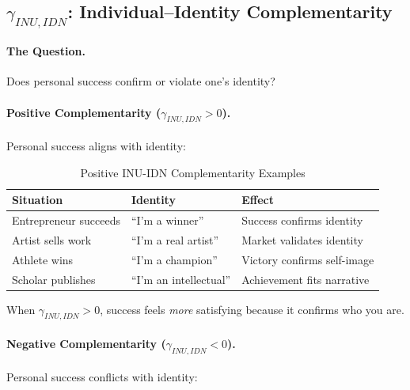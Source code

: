 \subsection{$\gamma_{INU,IDN}$: Individual--Identity Complementarity}

\paragraph{The Question.}
Does personal success confirm or violate one's identity?

\paragraph{Positive Complementarity ($\gamma_{INU,IDN} > 0$).}
Personal success aligns with identity:

\begin{table}[htbp]
\centering
\caption{Positive INU-IDN Complementarity Examples}
\label{tab:app-c-inu-idn-positive}
\renewcommand{\arraystretch}{1.3}
\begin{tabular}{@{}lll@{}}
\toprule
\textbf{Situation} & \textbf{Identity} & \textbf{Effect} \\
\midrule
Entrepreneur succeeds & ``I'm a winner'' & Success confirms identity \\
Artist sells work & ``I'm a real artist'' & Market validates identity \\
Athlete wins & ``I'm a champion'' & Victory confirms self-image \\
Scholar publishes & ``I'm an intellectual'' & Achievement fits narrative \\
\bottomrule
\end{tabular}
\end{table}

When $\gamma_{INU,IDN} > 0$, success feels \emph{more} satisfying because it 
confirms who you are.

\paragraph{Negative Complementarity ($\gamma_{INU,IDN} < 0$).}
Personal success conflicts with identity:

